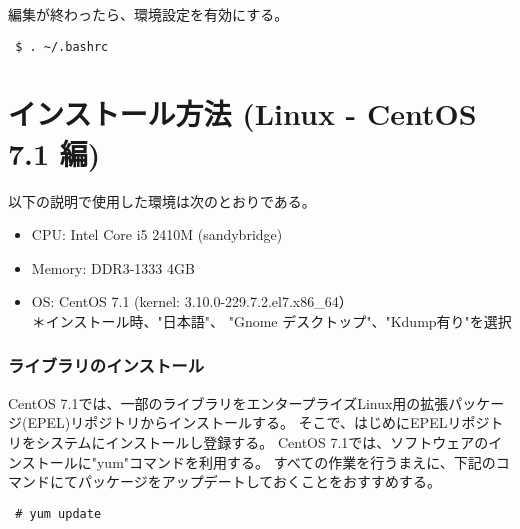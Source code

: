 編集が終わったら、環境設定を有効にする。
\begin{verbatim}
 $ . ~/.bashrc
\end{verbatim}


%
%


\section{インストール方法 (Linux - CentOS 7.1 編)}

以下の説明で使用した環境は次のとおりである。
\begin{itemize}
\item CPU: Intel Core i5 2410M (sandybridge)
\item Memory: DDR3-1333 4GB
\item OS: CentOS 7.1 (kernel: 3.10.0-229.7.2.el7.x86\_64）\\
{\small ＊インストール時、"日本語"、 "Gnome デスクトップ"、"Kdump有り"を選択}
\end{itemize}

\subsubsection{ライブラリのインストール}

CentOS 7.1では、一部のライブラリをエンタープライズLinux用の拡張パッケージ(EPEL)リポジトリからインストールする。
そこで、はじめにEPELリポジトリをシステムにインストールし登録する。
CentOS 7.1では、ソフトウェアのインストールに"yum"コマンドを利用する。
すべての作業を行うまえに、下記のコマンドにてパッケージをアップデートしておくことをおすすめする。
\begin{verbatim}
 # yum update
\end{verbatim}

